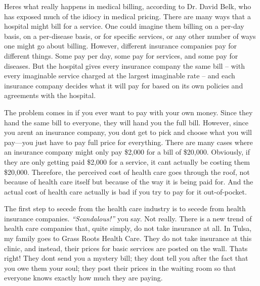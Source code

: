 \documentclass[letterpaper]{article}
\begin{document}
{\color{black}
Here{\textquotesingle}s what really happens in medical billing,
according to Dr. David Belk, who has exposed much of the idiocy in
medical pricing. There are many ways that a hospital might bill for a
service. One could imagine them billing on a per-day basis, on a
per-disease basis, or for specific services, or any
\textcolor[rgb]{0.32941177,0.5529412,0.83137256}{other number of ways
one might go about billing}. However, different insurance companies pay
for different things. Some pay per day, some pay for services, and some
pay for diseases.  But the hospital gives every insurance company the
same bill – with every imaginable service charged at the largest
imaginable rate – and each insurance company decides what it will pay
for based on its own policies and agreements with the hospital.}

{\color{black}
The problem comes in if you ever want to pay with your own money. Since
they hand the same bill to everyone, they will hand you the full bill.
However, since you aren{\textquotesingle}t an insurance company, you
don{\textquotesingle}t get to pick and choose what you will pay—you
just have to pay full price for everything. There are many cases where
an insurance company might only pay \$2,000 for a bill of \$20,000.
Obviously, if they are only getting paid \$2,000 for a service, it
can{\textquotesingle}t actually be costing them \$20,000. Therefore,
the perceived cost of health care goes through the roof, not because of
health care itself but because of the way it is being paid for. And the
actual cost of health care actually is bad if you try to pay for it
out-of-pocket.}

{\color{black}
The first step to secede from the health care industry is to secede from
health insurance companies.
\textit{“}\textit{\textcolor[rgb]{0.32941177,0.5529412,0.83137256}{Scandalous!”
}}\textcolor[rgb]{0.32941177,0.5529412,0.83137256}{you say. Not really.
}There is a new trend of health care companies that, quite simply, do
not take insurance at all. In Tulsa, my family goes to Grass Roots
Health Care.  They do not take insurance at this clinic, and instead,
their prices for basic services are posted on the wall. 
That{\textquotesingle}s
right\textcolor[rgb]{0.32941177,0.5529412,0.83137256}{! T}hey
don{\textquotesingle}t send you a mystery bill; they
don{\textquotesingle}t tell you after the fact that you owe them your
soul; they post their prices in the waiting room so that everyone knows
exactly how much they are paying.}
\end{document}
